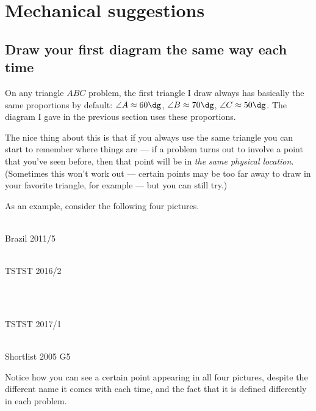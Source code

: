 \documentclass[11pt]{scrartcl}
\begin{document}
\section{Mechanical suggestions}
\subsection{Draw your first diagram the same way each time}
On any triangle $ABC$ problem, the first triangle I draw
always has basically the same proportions by default:
$\angle A \approx 60\dg$, $\angle B \approx 70\dg$, $\angle C \approx 50\dg$.
The diagram I gave in the previous section uses these proportions.

The nice thing about this is that
\alert{if you always use the same triangle
you can start to remember where things are} --- if a problem
turns out to involve a point that you've seen before,
then that point will be in \emph{the same physical location}.
(Sometimes this won't work out ---
certain points may be too far away to draw in your favorite triangle,
for example --- but you can still try.)


As an example, consider the following four pictures.
\begin{center}
  \begin{minipage}[t]{6.5cm}
  \\ \centering \sffamily Brazil 2011/5
  \end{minipage}
  \quad
  \begin{minipage}[t]{6.5cm}
  \\ \centering \sffamily TSTST 2016/2
  \end{minipage}
  \\
  \begin{minipage}[t]{6.5cm}
  \\ \centering \sffamily TSTST 2017/1
  \end{minipage}
  \quad
  \begin{minipage}[t]{6.5cm}
  \\ \centering \sffamily Shortlist 2005 G5
  \end{minipage}
\end{center}
Notice how you can see a certain point appearing in all four pictures,
despite the different name it comes with each time,
and the fact that it is defined differently in each problem.
\end{document}
